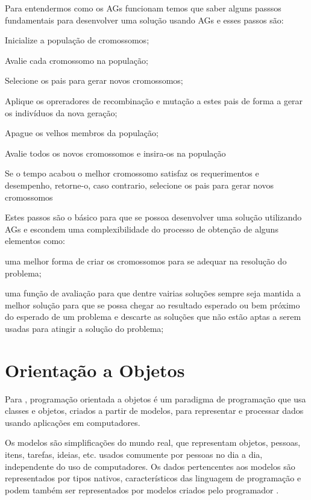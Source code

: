 \par Para entendermos como os AGs funcionam temos que saber alguns passsos
fundamentais para desenvolver uma solução usando AGs e esses passos são:
\item Inicialize a população de cromossomos;
\item Avalie cada cromossomo na população;
\item Selecione os pais para gerar novos cromossomos;
\item Aplique os opreradores de recombinação e mutação a estes pais de forma a
gerar os indivíduos da nova geração;
\item Apague os velhos membros da população;
\item Avalie todos os novos cromossomos e insira-os na população
\item Se o tempo acabou o melhor cromossomo satisfaz os requerimentos e
desempenho, retorne-o, caso contrario, selecione os pais para gerar novos
cromossomos

\par Estes passos são o básico para que se possoa desenvolver uma solução
utilizando AGs e escondem uma complexibilidade do processo de obtenção de alguns
elementos como:
\item uma melhor forma de criar os cromossomos para se adequar na resolução do
problema;
\item uma função de avaliação para que dentre vairias soluções
sempre seja mantida a melhor solução para que se possa chegar ao resultado
esperado ou bem próximo do esperado de um problema e descarte as soluções que
não estão aptas a serem usadas para atingir a solução do problema;

\section{Orientação a Objetos}

\par Para ,
programação orientada a objetos é um paradigma de programação que usa
classes e objetos, criados a partir de modelos, para representar e processar
dados usando aplicações em computadores.

\par Os modelos são simplificações do mundo real, que representam
objetos, pessoas, itens, tarefas, ideias, etc. usados comumente por
pessoas no dia a dia, independente do uso de computadores. 
Os dados pertencentes aos modelos são representados por tipos nativos,
característicos das linguagem de programação e podem também ser representados
por modelos criados pelo
programador \cite{livro_intro_a_prog_orientada_objetos_usando_java}.

